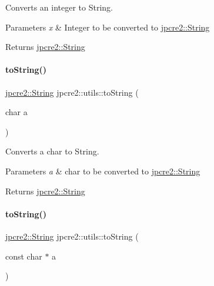 Converts an integer to String. 


\begin{DoxyParams}{Parameters}
{\em x} & Integer to be converted to \hyperlink{namespacejpcre2_a91f03070152fb228bc116c5a737f1d16}{jpcre2\+::\+String} \\
\hline
\end{DoxyParams}
\begin{DoxyReturn}{Returns}
\hyperlink{namespacejpcre2_a91f03070152fb228bc116c5a737f1d16}{jpcre2\+::\+String} 
\end{DoxyReturn}
\hypertarget{namespacejpcre2_1_1utils_a917512161b56047d6ef240bdba2ac212_a917512161b56047d6ef240bdba2ac212}{}\label{namespacejpcre2_1_1utils_a917512161b56047d6ef240bdba2ac212_a917512161b56047d6ef240bdba2ac212} 
\paragraph{\texorpdfstring{to\+String()}{toString()}\hspace{0.1cm}{\footnotesize\ttfamily [2/4]}}
{\footnotesize\ttfamily \hyperlink{namespacejpcre2_a91f03070152fb228bc116c5a737f1d16}{jpcre2\+::\+String} jpcre2\+::utils\+::to\+String (\begin{DoxyParamCaption}\item[{char}]{a }\end{DoxyParamCaption})}



Converts a char to String. 


\begin{DoxyParams}{Parameters}
{\em a} & char to be converted to \hyperlink{namespacejpcre2_a91f03070152fb228bc116c5a737f1d16}{jpcre2\+::\+String} \\
\hline
\end{DoxyParams}
\begin{DoxyReturn}{Returns}
\hyperlink{namespacejpcre2_a91f03070152fb228bc116c5a737f1d16}{jpcre2\+::\+String} 
\end{DoxyReturn}
\hypertarget{namespacejpcre2_1_1utils_a4065a2a40144999cd2a94e7a7e1d5eb6_a4065a2a40144999cd2a94e7a7e1d5eb6}{}\label{namespacejpcre2_1_1utils_a4065a2a40144999cd2a94e7a7e1d5eb6_a4065a2a40144999cd2a94e7a7e1d5eb6} 
\paragraph{\texorpdfstring{to\+String()}{toString()}\hspace{0.1cm}{\footnotesize\ttfamily [3/4]}}
{\footnotesize\ttfamily \hyperlink{namespacejpcre2_a91f03070152fb228bc116c5a737f1d16}{jpcre2\+::\+String} jpcre2\+::utils\+::to\+String (\begin{DoxyParamCaption}\item[{const char $\ast$}]{a }\end{DoxyParamCaption})}



